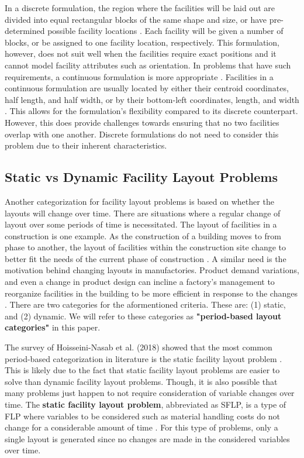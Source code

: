 In a discrete formulation, the region where the facilities will be laid out are divided into equal rectangular blocks of the same shape and size, or have pre-determined possible facility locations \cite{Drira2007}. Each facility will be given a number of blocks, or be assigned to one facility location, respectively. This formulation, however, does not suit well when the facilities require exact positions and it cannot model facility attributes such as orientation. In problems that have such requirements, a continuous formulation is more appropriate \cite{Hosseini-Nasab2018}. Facilities in a continuous formulation are usually located by either their centroid coordinates, half length, and half width, or by their bottom-left coordinates, length, and width \cite{Drira2007}. This allows for the formulation's flexibility compared to its discrete counterpart. However, this does provide challenges towards ensuring that no two facilities overlap with one another. Discrete formulations do not need to consider this problem due to their inherent characteristics.

\subsection{Static vs Dynamic Facility Layout Problems}
Another categorization for facility layout problems is based on whether the layouts will change over time. There are situations where a regular change of layout over some periods of time is necessitated. The layout of facilities in a construction is one example. As the construction of a building moves to from phase to another, the layout of facilities within the construction site change to better fit the needs of the current phase of construction \cite{Farmakis2018}. A similar need is the motivation behind changing layouts in manufactories. Product demand variations, and even a change in product design can incline a factory's management to reorganize facilities in the building to be more efficient in response to the changes \cite{Pourhassan2017}. There are two categories for the aformentioned criteria. These are: (1) static, and (2) dynamic. We will refer to these categories as \textbf{"period-based layout categories"} in this paper.

The survey of Hoisseini-Nasab et al. (2018) showed that the most common period-based categorization in literature is the static facility layout problem \cite{Hosseini-Nasab2018}. This is likely due to the fact that static facility layout problems are easier to solve than dynamic facility layout problems. Though, it is also possible that many problems just happen to not require consideration of variable changes over time. The \textbf{static facility layout problem}, abbreviated as SFLP, is a type of FLP where variables to be considered such as material handling costs do not change for a considerable amount of time \cite{Perez-Gosende2020}. For this type of problems, only a single layout is generated since no changes are made in the considered variables over time.

